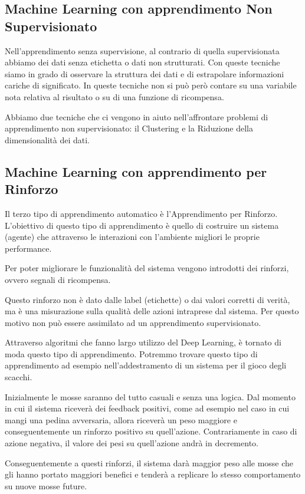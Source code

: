 \documentclass[12pt,italian]{report}
\begin{document}
\subsection{Machine Learning con apprendimento Non Supervisionato}
Nell’apprendimento senza supervisione, al contrario di quella supervisionata abbiamo dei dati senza etichetta o dati non strutturati. Con queste tecniche siamo in grado di osservare la struttura dei dati e di estrapolare informazioni cariche di significato. In queste tecniche non si può però contare su una variabile nota relativa al risultato o su di una funzione di ricompensa.

Abbiamo due tecniche che ci vengono in aiuto nell’affrontare problemi di apprendimento non supervisionato: il Clustering e la Riduzione della dimensionalità dei dati.
\subsection{Machine Learning con apprendimento per Rinforzo}
Il terzo tipo di apprendimento automatico è l’Apprendimento per Rinforzo. L’obiettivo di questo tipo di apprendimento è quello di costruire un sistema (agente) che attraverso le interazioni con l’ambiente migliori le proprie performance.

Per poter migliorare le funzionalità del sistema vengono introdotti dei rinforzi, ovvero segnali di ricompensa.

Questo rinforzo non è dato dalle label (etichette) o dai valori corretti di verità, ma è una misurazione sulla qualità delle azioni intraprese dal sistema. Per questo motivo non può essere assimilato ad un apprendimento supervisionato.

Attraverso algoritmi che fanno largo utilizzo del Deep Learning, è tornato di moda questo tipo di apprendimento. Potremmo trovare questo tipo di apprendimento ad esempio nell’addestramento di un sistema per il gioco degli scacchi.

Inizialmente le mosse saranno del tutto casuali e senza una logica. Dal momento in cui il sistema riceverà dei feedback positivi, come ad esempio nel caso in cui mangi una pedina avversaria, allora riceverà un peso maggiore e conseguentemente un rinforzo positivo su quell’azione. Contrariamente in caso di azione negativa, il valore dei pesi su quell’azione andrà in decremento.

Conseguentemente a questi rinforzi, il sistema darà maggior peso alle mosse che gli hanno portato maggiori benefici e tenderà a replicare lo stesso comportamento su nuove mosse future.
\end{document}
